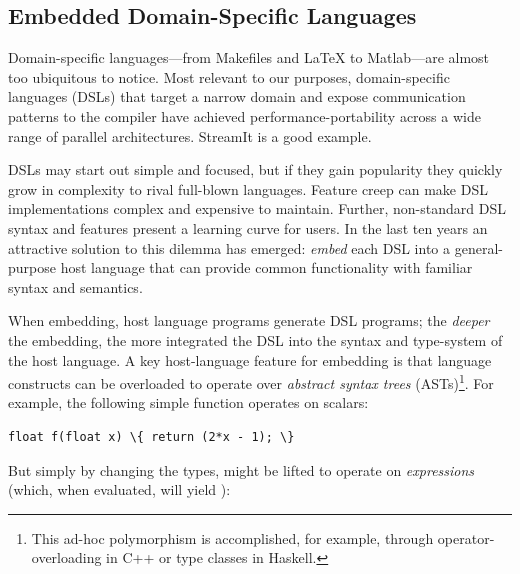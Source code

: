 \subsection{Embedded Domain-Specific Languages}


Domain-specific languages---from Makefiles and \LaTeX{} to
Matlab---are almost too ubiquitous to notice.  Most relevant to our
purposes, domain-specific languages (DSLs) that target a narrow domain and expose communication
patterns to the compiler 
 have achieved performance-portability across a wide range of parallel
architectures.  
StreamIt\cite{streamit} is a good example.
% 

DSLs may start out simple and focused, but if they gain popularity
they quickly grow in complexity to rival full-blown languages.
Feature creep
can make DSL implementations complex and expensive to maintain.
Further, non-standard DSL syntax and features present a learning curve for users.  In the
last ten years an attractive solution to this dilemma has emerged: {\em
  embed} each DSL into a general-purpose host language that can provide
common functionality with familiar syntax and semantics.

When embedding, host language programs {generate} DSL programs;
the {\em deeper} the embedding, the more integrated the
DSL into the syntax and type-system of the host language.
%
A key host-language feature for embedding is that
language constructs can be overloaded to operate over {\em abstract
  syntax trees} (ASTs)\footnote{This ad-hoc polymorphism is accomplished,
for example, through operator-overloading in C++ or type classes in
Haskell.}.  For example, the following simple function operates on scalars:


\vspace{1mm}
\begin{Verbatim}[commandchars=\\\{\}]
  float f(float x) \{ return (2*x - 1); \}
\end{Verbatim}
\noindent
But simply by changing the types,  might be lifted to operate on {\em
  expressions} (which, when evaluated, will yield ):

